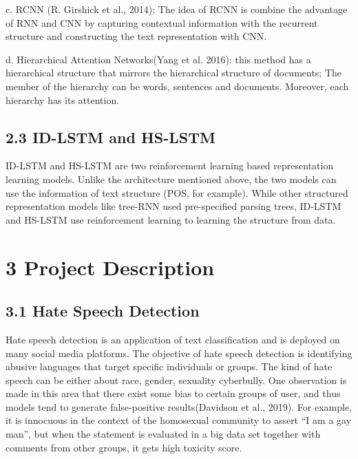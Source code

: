 \documentclass[10pt]{article}
\begin{document}
c.	RCNN \cite{DBLP:conf/cvpr/GirshickDDM14}(R. Girshick et al., 2014): The idea of RCNN is combine the advantage of RNN and CNN by capturing contextual information with the recurrent structure and constructing the text representation with CNN. 

d.	Hierarchical Attention Networks\cite{DBLP:conf/naacl/YangYDHSH16}(Yang et al. 2016):  this method has a hierarchical structure that mirrors the hierarchical structure of documents; The member of the hierarchy can be words, sentences and documents. Moreover, each hierarchy has its attention.

\subsection*{2.3 ID-LSTM and HS-LSTM }
ID-LSTM and HS-LSTM are two reinforcement learning based representation learning models. Unlike the architecture mentioned above, the two models can use the information of text structure (POS, for example). While other structured representation models like tree-RNN used pre-specified parsing trees, ID-LSTM and HS-LSTM use reinforcement learning to learning the structure from data.

\section*{3 Project Description}

\subsection*{3.1 Hate Speech Detection}
Hate speech detection is an application of text classification and is deployed on many social media platforms. The objective of hate speech detection is identifying abusive languages that target specific individuals or groups. The kind of hate speech can be either about race, gender, sexuality cyberbully. One observation is made in this area that there exist some bias to certain groups of user, and thus models tend to generate false-positive results\cite{DBLP:journals/corr/abs-1905-12516}(Davidson et al., 2019). For example, it is innocuous in the context of the homosexual community to assert “I am a gay man”, but when the statement is evaluated in a big data set together with comments from other groups, it gets high toxicity score.
\end{document}
